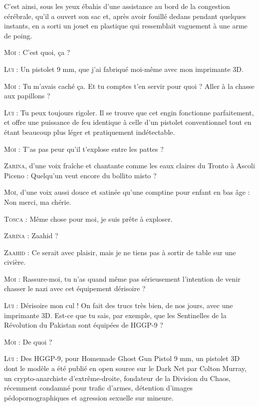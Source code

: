 C’est ainsi, sous les yeux ébahis d’une assistance au bord de la congestion cérébrale, qu’il a ouvert son sac et, après avoir fouillé dedans pendant quelques instants, en a sorti un jouet en plastique qui ressemblait vaguement à une arme de poing.

\begin{dialogue}

%
%
%
\textsc{Moi} : C’est quoi, ça ?

\textsc{Lui} : Un pistolet 9 mm, que j’ai fabriqué moi-même avec mon imprimante 3D.

\textsc{Moi} : Tu m’avais caché ça. Et tu comptes t’en servir pour quoi ? Aller à la chasse aux papillons ?

\textsc{Lui} : Tu peux toujours rigoler. Il se trouve que cet engin fonctionne parfaitement, et offre une puissance de feu identique à celle d’un pistolet conventionnel tout en étant beaucoup plus léger et pratiquement indétectable.

\textsc{Moi} : T’as pas peur qu’il t’explose entre les pattes ?

\textsc{Zarina}, d’une voix fraîche et chantante comme les eaux claires du Tronto à Ascoli Piceno : Quelqu’un veut encore du bollito misto ?

\textsc{Moi}, d’une voix aussi douce et satinée qu’une comptine pour enfant en bas âge : Non merci, ma chérie.

\textsc{Tosca} : Même chose pour moi, je suis prête à exploser.

\textsc{Zarina} : Zaahid ?

\textsc{Zaahid} : Ce serait avec plaisir, mais je ne tiens pas à sortir de table sur une civière.

\textsc{Moi} : Rassure-moi, tu n’as quand même pas sérieusement l’intention de venir chasser le nazi avec cet équipement dérisoire ?

\textsc{Lui} : Dérisoire mon cul ! On fait des trucs très bien, de nos jours, avec une imprimante 3D. Est-ce que tu sais, par exemple, que les Sentinelles de la Révolution du Pakistan sont équipées de HGGP-9 ?

\textsc{Moi} : De quoi ?

\textsc{Lui} : Des HGGP-9, pour Homemade Ghost Gun Pistol 9 mm, un pistolet 3D dont le modèle a été publié en open source sur le Dark Net par Colton Murray, un crypto-anarchiste d’extrême-droite, fondateur de la Division du Chaos, récemment condamné pour trafic d’armes, détention d’images pédopornographiques et agression sexuelle sur mineure.


\end{dialogue}
